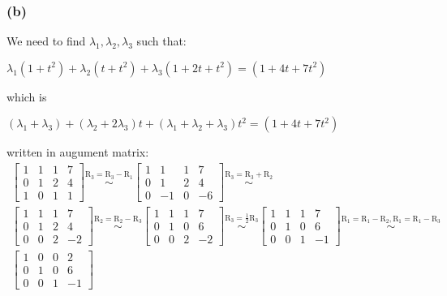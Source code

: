 \documentclass[12pt]{article}
\begin{document}
\subsubsection*{(b)}
  We need to find $\lambda_1, \lambda_2, \lambda_3$ such that:
  \begin{center}
    $\lambda_1 (1 + t^2)+\lambda_2(t + t^2)+\lambda_3(1+2t+t^2)=(1+4t+7t^2)$
  \end{center}
  which is
  \begin{center}
    $(\lambda_1 + \lambda_3) + (\lambda_2 + 2\lambda_3)t + (\lambda_1+\lambda_2+\lambda_3)t^2=(1+4t+7t^2)$
  \end{center}
  written in augument matrix:
  \[
  \begin{array}{c}
  \left[\begin{array}{ccc|c}
  1 & 1 & 1 & 7 \\
  0 & 1 & 2 & 4 \\
  1 & 0 & 1 & 1
  \end{array}\right]
  \overset{\text{R}_3 = \text{R}_3 - \text{R}_1}{\sim}
  \left[\begin{array}{ccc|c}
  1 & 1 & 1 & 7 \\
  0 & 1 & 2 & 4 \\
  0 & -1 & 0 & -6
  \end{array}\right]
  \overset{\text{R}_3 = \text{R}_3 + \text{R}_2}{\sim} \\
  \left[\begin{array}{ccc|c}
  1 & 1 & 1 & 7 \\
  0 & 1 & 2 & 4 \\
  0 & 0 & 2 & -2
  \end{array}\right]
  \overset{\text{R}_2 = \text{R}_2 - \text{R}_3}{\sim}
  \left[\begin{array}{ccc|c}
  1 & 1 & 1 & 7 \\
  0 & 1 & 0 & 6 \\
  0 & 0 & 2 & -2
  \end{array}\right]
  \overset{\text{R}_3 = \frac{1}{2} \text{R}_3}{\sim}
  \left[\begin{array}{ccc|c}
  1 & 1 & 1 & 7 \\
  0 & 1 & 0 & 6 \\
  0 & 0 & 1 & -1
  \end{array}\right]
  \overset{\text{R}_1 = \text{R}_1 - \text{R}_2,\text{R}_1 = \text{R}_1 - \text{R}_3}{\sim} \\
  \left[\begin{array}{ccc|c}
  1 & 0 & 0 & 2 \\
  0 & 1 & 0 & 6 \\
  0 & 0 & 1 & -1
  \end{array}\right]
  \end{array}
  \]
\end{document}
